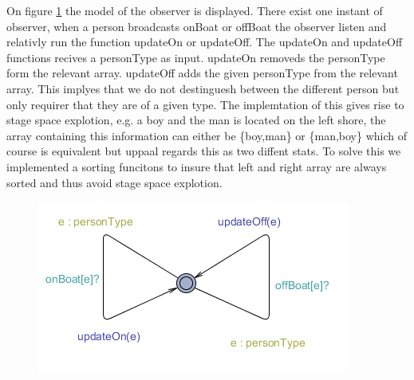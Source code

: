 On figure \ref{fig:observer} the model of the observer is displayed. There exist one instant of observer, when a person broadcasts onBoat or offBoat the observer listen and relativly run the function updateOn or updateOff. 
The updateOn and updateOff functions recives a personType as input. updateOn removeds the personType form the relevant array. updateOff adds the given personType from the relevant array. This implyes that we do not destinguesh between the different person but only requirer that they are of a given type. The implemtation of this gives rise to stage space explotion, e.g. a boy and the man is located on the left shore, the array containing this information can either be \{boy,man\} or \{man,boy\} which of course is equivalent but uppaal regards this as two diffent stats. To solve this we implemented a sorting funcitons to insure that left and right array are always sorted and thus avoid stage space explotion.
  




\begin{figure}%
\includegraphics[width=\columnwidth]{pictures/observer.png}%
\caption{}%
\label{fig:observer}%
\end{figure}


